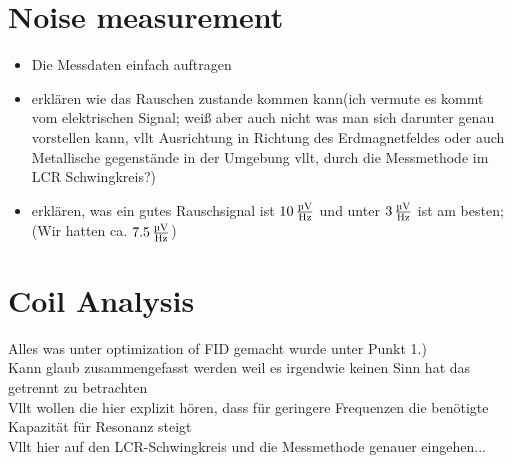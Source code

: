 
\usepackage{hyperref}
\usepackage{ wasysym }
\usepackage{MnSymbol,wasysym}

\section{Noise measurement}
    \begin{itemize}
        \item Die Messdaten einfach auftragen
        \item erklären wie das Rauschen zustande kommen kann(ich vermute es kommt vom elektrischen Signal; weiß aber auch nicht was man sich darunter genau vorstellen kann, vllt Ausrichtung in Richtung des Erdmagnetfeldes oder auch Metallische gegenstände in der Umgebung vllt, durch die Messmethode im LCR Schwingkreis?)
        \item erklären, was ein gutes Rauschsignal ist $\SI[]{10}{\frac{\micro \volt}{\hertz}}$ und unter $\SI[]{3}{\frac{\micro \volt}{\hertz}}$ ist am besten; (Wir hatten ca. $\SI[]{7.5}{\frac{\micro \volt}{\hertz}}$)
    \end{itemize}

\section{Coil Analysis}
    Alles was unter optimization of FID gemacht wurde unter Punkt 1.)\\
    Kann glaub zusammengefasst werden weil es irgendwie keinen Sinn hat das getrennt zu betrachten\\
    Vllt wollen die hier explizit hören, dass für geringere Frequenzen die benötigte Kapazität für Resonanz steigt\\
    Vllt hier auf den LCR-Schwingkreis und die Messmethode genauer eingehen...

